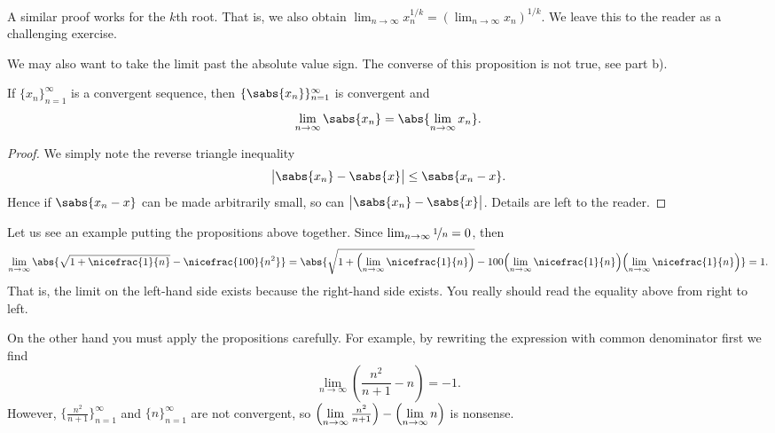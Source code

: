 A similar proof works for the $k$th root.  That is, we also
obtain
$\lim_{n\to\infty} x_n^{1/k} = {( \lim_{n\to\infty} x_n )}^{1/k}$.  We leave this to the reader
as a challenging exercise.

We may also want to take the limit past the absolute value sign.
The converse of this proposition is not true, see
 part b).

\begin{prop}
If $\{ x_n \}_{n=1}^\infty$ is a convergent sequence, then $\{ \sabs{x_n} \}_{n=1}^\infty$
is convergent and
\begin{equation*}
\lim_{n\to\infty} \sabs{x_n} = 
\abs{\lim_{n\to\infty} x_n} .
\end{equation*}
\end{prop}

\begin{proof}
We simply note the reverse triangle inequality
\begin{equation*}
\big\lvert \sabs{x_n} - \sabs{x} \big\rvert \leq \sabs{x_n-x} .
\end{equation*}
Hence if $\sabs{x_n -x}$ can be made arbitrarily small, so can
$\big\lvert \sabs{x_n} - \sabs{x} \big\rvert$.
Details are left to the reader.
\end{proof}

Let us see an example putting the propositions above together.  Since
$\lim_{n\to\infty} \nicefrac{1}{n} = 0$, then
\begin{equation*}
\lim_{n\to \infty}
\abs{\sqrt{1 + \nicefrac{1}{n}} - \nicefrac{100}{n^2}} =  
\abs{\sqrt{1 + \Bigl(\lim_{n\to\infty} \nicefrac{1}{n}\Bigr)}
- 100 \Bigl(\lim_{n\to\infty} \nicefrac{1}{n}\Bigr)\Bigl(\lim_{n\to\infty} \nicefrac{1}{n}\Bigr)} = 1.
\end{equation*}
That is, the limit on the left-hand side exists because the right-hand
side exists.  You really should read the equality above from right to left.

On the other hand you must apply the propositions carefully.
For example, by rewriting the expression with common denominator first
we find
\begin{equation*}
\lim_{n\to \infty} \left( \frac{n^2}{n+1} - n \right)
= -1 .
\end{equation*}
However, 
$\bigl\{ \frac{n^2}{n+1} \bigr\}_{n=1}^\infty$ and 
$\{n\}_{n=1}^\infty$ are not convergent,
so
$\Bigl(\lim\limits_{n\to\infty} \frac{n^2}{n+1}\Bigr) -
\Bigl(\lim\limits_{n\to\infty} n\Bigr)$ is nonsense.

